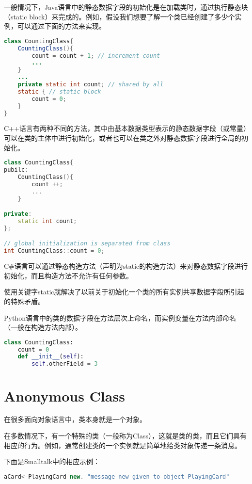 一般情况下，Java语言中的静态数据字段的初始化是在加载类时，通过执行静态块（static block）来完成的。例如，假设我们想要了解一个类已经创建了多少个实例，可以通过下面的方法来实现。

\begin{lstlisting}[language=Java]
class CountingClass{
	CountingClass(){
		count = count + 1; // increment count
		...
	}
	...
	private static int count; // shared by all
	static { // static block
		count = 0;
	}
}
\end{lstlisting}

C++语言有两种不同的方法，其中由基本数据类型表示的静态数据字段（或常量）可以在类的主体中进行初始化，或者也可以在类之外对静态数据字段进行全局的初始化。



\begin{lstlisting}[language=C++]
class CountingClass{
pubilc:
	CountingClass(){
		count ++;
		...
	}

private:
	static int count;
};

// global initialization is separated from class
int CountingClass::count = 0;
\end{lstlisting}

C\#语言可以通过静态构造方法（声明为static的构造方法）来对静态数据字段进行初始化，而且构造方法不允许有任何参数。


使用关键字static就解决了以前关于初始化一个类的所有实例共享数据字段所引起的特殊矛盾。

Python语言中的类的数据字段在方法层次上命名，而实例变量在方法内部命名（一般在构造方法内部）。

\begin{lstlisting}[language=Python]
class CountingClass:
	count = 0
	def __init__(self):
		self.otherField = 3
\end{lstlisting}



\section{Anonymous Class}

在很多面向对象语言中，类本身就是一个对象。

在多数情况下，有一个特殊的类（一般称为Class），这就是类的类，而且它们具有相应的行为。例如，通常创建类的一个实例就是简单地给类对象传递一条消息。




下面是Smalltalk中的相应示例：

\begin{lstlisting}[language=C++]
aCard<-PlayingCard new. "message new given to object PlayingCard"
\end{lstlisting}

